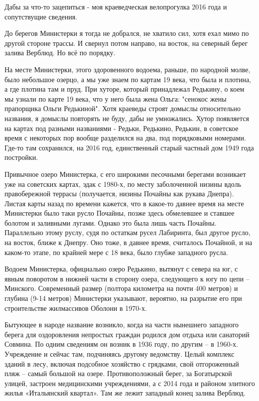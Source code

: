 Дабы за что-то зацепиться - моя краеведческая велопрогулка 2016 года и сопутствущие сведения. 

До берегов Министерки я тогда не добрался, не хватило сил, хотя ехал мимо по другой стороне трассы. И свернул потом направо, на восток, на северный берег залива Верблюд. Но всё по порядку.

На месте Министерки, этого здоровенного водоема, раньше, по народной молве, было небольшое озерцо, а мы уже знаем по картам 19 века, что была и плотина, а где плотина там и пруд. При хуторе, который принадлежал Редькину, о коем мы узнали по карте 19 века, что у него была жена Ольга: "сенокос жены прапорщика Ольги Редькиной". Хотя краеведы строят домыслы относительно названия,  я домыслы повторять не буду, дабы не умножались. Хутор появляется на картах под разными названиями - Редьки, Редькино, Редькин, в советское время с некоторых пор вообще разделился на два, под порядковыми номерами. Где-то там сохранился, на 2016 год, единственный старый частный дом 1949 года постройки. 

Привычное озеро Министерка, с его широкими песочными берегами возникает уже на советских картах, эдак с 1980-х, по месту заболоченной низины вдоль правобережной террасы (получается, низины Почайны как рукава Днепра). Листая карты назад по времени кажется, что в какое-то давнее время на месте Министерки было таки русло Почайны, позже здесь обмелевшее и ставшее болотом и заливными лугами. Однако это была лишь часть Почайны. Параллельно этому руслу, судя по остаткам русел Лабиринта, был другое русло, на восток, ближе к Днепру. Оно тоже, в давнее время, считалось Почайной, и на каком-то этапе, по крайней мере с 18 века, было глубже западного русла. 

Водоем Министерка, официально озеро Редькино, вытянут с севера на юг, с явным поворотом в нижней части в сторону озера, следующего к югу по цепи – Минского. Современный размер (полтора километра на почти 400 метров) и глубина (9-14 метров) Министерки указывают, вероятно, на разрытие его при строительстве жилмассивов Оболони в 1970-х.

Бытующее в народе название возникло, когда на части нынешнего западного берега для оздоровления непростых граждан родился дом отдыха или санаторий Совмина. По одним сведениям он возник в 1936 году, по другим – в 1960-х. Учреждение и сейчас там, подчиняясь другому ведомству. Целый комплекс зданий в лесу, включая подсобное хозяйство с грядками, свой отгороженный пляж – самый большой на озере. Противоположный берег, за Богатырской улицей, застроен медицинскими учреждениями, а с 2014 года и районом элитного жилья «Итальянский квартал». Там же лежит западный конец залива Верблюд.

